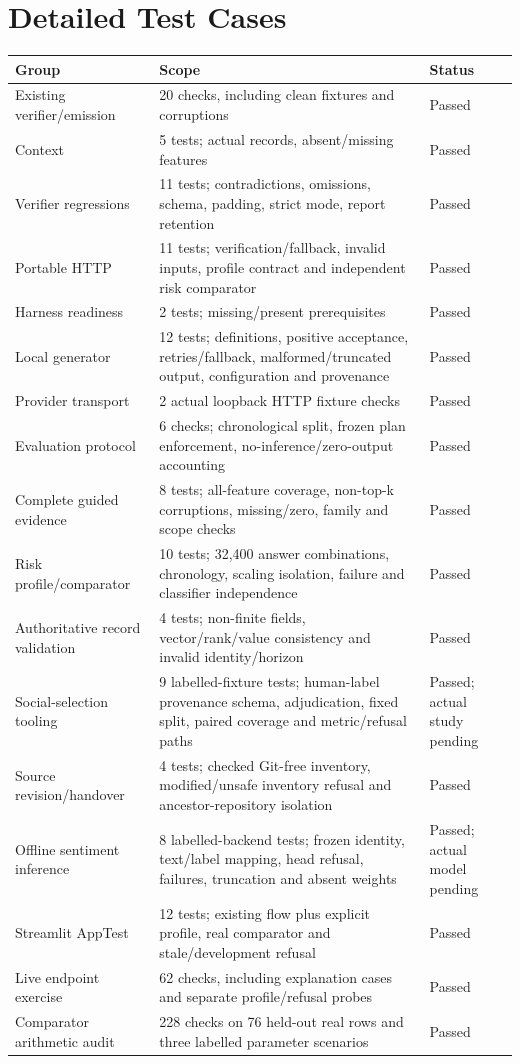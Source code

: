\chapter{Detailed Test Cases}
\begin{longtable}{p{}p{}p{}}
\toprule Group & Scope & Status\\\midrule
Existing verifier/emission & 20 checks, including clean fixtures and corruptions & Passed\\
Context & 5 tests; actual records, absent/missing features & Passed\\
Verifier regressions & 11 tests; contradictions, omissions, schema, padding, strict mode, report retention & Passed\\
Portable HTTP & 11 tests; verification/fallback, invalid inputs, profile contract and independent risk comparator & Passed\\
Harness readiness & 2 tests; missing/present prerequisites & Passed\\
Local generator & 12 tests; definitions, positive acceptance, retries/fallback, malformed/truncated output, configuration and provenance & Passed\\
Provider transport & 2 actual loopback HTTP fixture checks & Passed\\
Evaluation protocol & 6 checks; chronological split, frozen plan enforcement, no-inference/zero-output accounting & Passed\\
Complete guided evidence & 8 tests; all-feature coverage, non-top-k corruptions, missing/zero, family and scope checks & Passed\\
Risk profile/comparator & 10 tests; 32,400 answer combinations, chronology, scaling isolation, failure and classifier independence & Passed\\
Authoritative record validation & 4 tests; non-finite fields, vector/rank/value consistency and invalid identity/horizon & Passed\\
Social-selection tooling & 9 labelled-fixture tests; human-label provenance schema, adjudication, fixed split, paired coverage and metric/refusal paths & Passed; actual study pending\\
Source revision/handover & 4 tests; checked Git-free inventory, modified/unsafe inventory refusal and ancestor-repository isolation & Passed\\
Offline sentiment inference & 8 labelled-backend tests; frozen identity, text/label mapping, head refusal, failures, truncation and absent weights & Passed; actual model pending\\
Streamlit AppTest & 12 tests; existing flow plus explicit profile, real comparator and stale/development refusal & Passed\\
Live endpoint exercise & 62 checks, including explanation cases and separate profile/refusal probes & Passed\\
Comparator arithmetic audit & 228 checks on 76 held-out real rows and three labelled parameter scenarios & Passed\\
\bottomrule
\end{longtable}
